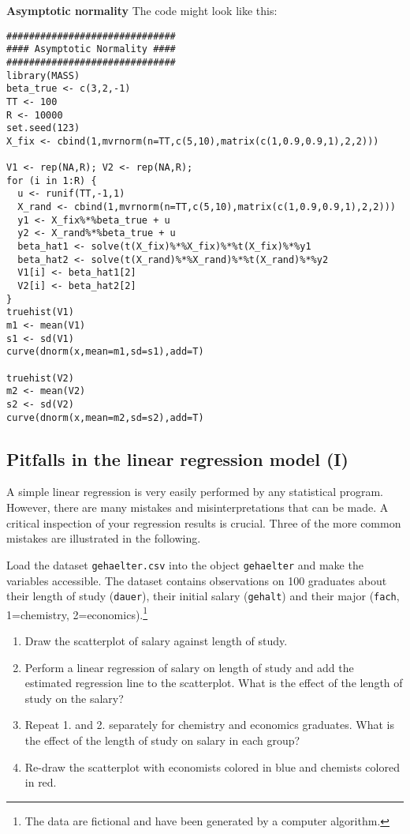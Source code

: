 \documentclass{article}
\begin{document}
\begin{solution}
\textbf{Asymptotic normality}
The code might look like this:
\begin{verbatim}
##############################
#### Asymptotic Normality ####
##############################
library(MASS)
beta_true <- c(3,2,-1)
TT <- 100
R <- 10000
set.seed(123)
X_fix <- cbind(1,mvrnorm(n=TT,c(5,10),matrix(c(1,0.9,0.9,1),2,2)))

V1 <- rep(NA,R); V2 <- rep(NA,R);
for (i in 1:R) {
  u <- runif(TT,-1,1)
  X_rand <- cbind(1,mvrnorm(n=TT,c(5,10),matrix(c(1,0.9,0.9,1),2,2)))
  y1 <- X_fix%*%beta_true + u
  y2 <- X_rand%*%beta_true + u
  beta_hat1 <- solve(t(X_fix)%*%X_fix)%*%t(X_fix)%*%y1
  beta_hat2 <- solve(t(X_rand)%*%X_rand)%*%t(X_rand)%*%y2
  V1[i] <- beta_hat1[2]
  V2[i] <- beta_hat2[2]
}
truehist(V1)
m1 <- mean(V1)
s1 <- sd(V1)
curve(dnorm(x,mean=m1,sd=s1),add=T)

truehist(V2)
m2 <- mean(V2)
s2 <- sd(V2)
curve(dnorm(x,mean=m2,sd=s2),add=T)
\end{verbatim}
\end{solution}

\subsection{Pitfalls in the linear regression model (I)}

A simple linear regression is very easily performed by any statistical
program. However, there are many mistakes and misinterpretations that can be
made. A critical inspection of your regression results is crucial. Three of
the more common mistakes are illustrated in the following.

Load the dataset \texttt{gehaelter.csv} into the object \texttt{gehaelter} and make
the variables accessible. The dataset contains
observations on 100 graduates about their length of study (\texttt{dauer}),
their initial salary (\texttt{gehalt}) and their major (\texttt{fach},
1=chemistry, 2=economics).\footnote{%
The data are fictional and have been generated by a computer algorithm.}

\begin{enumerate}
\item Draw the scatterplot of salary against length of study.

\item Perform a linear regression of salary on length of study and add the
estimated regression line to the scatterplot. What is the effect of the
length of study on the salary?

\item Repeat 1. and 2. separately for chemistry and economics graduates.
What is the effect of the length of study on salary in each group?

\item Re-draw the scatterplot with economists colored in blue and chemists
colored in red.
\end{enumerate}
\end{document}
